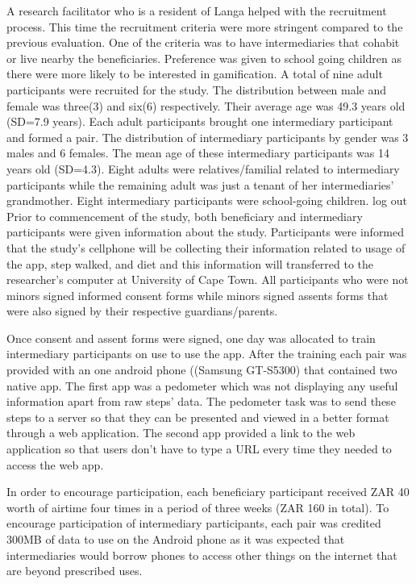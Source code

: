 A research facilitator who is a resident of Langa helped with the recruitment process. This time the recruitment criteria were more stringent compared to the previous evaluation. One of the criteria was to have intermediaries that cohabit or live nearby the beneficiaries. Preference was given to school going children as there were more likely to be interested in gamification. A total of nine adult participants were recruited for the study. The distribution between male and female was three(3) and six(6) respectively. Their average age was 49.3 years old (SD=7.9 years). Each adult participants brought one intermediary participant and formed a pair. The distribution of intermediary participants by gender was 3 males and 6 females. The mean age of these intermediary participants was 14 years old (SD=4.3).  Eight adults  were relatives/familial related to intermediary participants while the remaining adult was just a tenant of her intermediaries' grandmother. Eight intermediary participants were school-going children.
log out
Prior to commencement of the study, both beneficiary and intermediary participants were given information about the study. Participants were informed that the study's cellphone will be collecting their information related to usage of the app, step walked,  and diet and this information will transferred to the researcher's computer at University of Cape Town. All participants who were not minors signed informed consent forms while minors signed assents forms that were also signed by their respective guardians/parents.

Once consent and assent forms were signed, one day was allocated to train intermediary participants on use to use the app. After the training each pair was provided with an one android phone ((Samsung
GT-S5300) that contained two native app. The first app was a pedometer which was not displaying any useful information apart from raw steps' data. The pedometer task was to send these steps to a server so that they can be presented  and viewed in a better format through a web application. The second app provided a link to the web application so that users don't have to type a URL every time they needed to access the web app.

In order to encourage participation, each beneficiary participant received ZAR 40 worth of airtime four times in a period of three weeks (ZAR 160 in total). To encourage participation of intermediary participants, each pair was credited 300MB of data to use on the Android phone as it was expected that intermediaries would borrow phones to access other things on the internet that are beyond prescribed uses.

